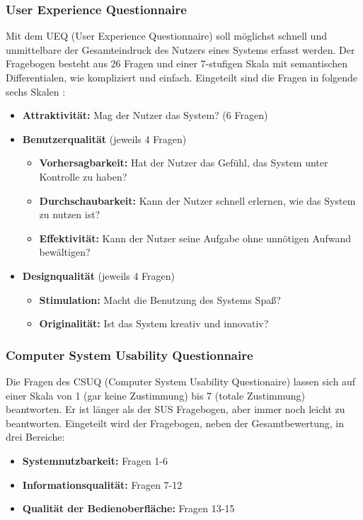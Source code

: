 \subsubsection*{User Experience Questionnaire}
Mit dem UEQ (User Experience Questionnaire) soll möglichst schnell und unmittelbare der Gesamteindruck des Nutzers eines Systems erfasst werden. Der Fragebogen besteht aus 26 Fragen und einer 7-stufigen Skala mit semantischen Differentialen, wie kompliziert und einfach. Eingeteilt sind die Fragen in folgende sechs Skalen \cite{} :
\begin{itemize}
\item \textbf{Attraktivität:} Mag der Nutzer das System? (6 Fragen)
\item \textbf{Benutzerqualität} (jeweils 4 Fragen)
	\begin{itemize}
	\item \textbf{Vorhersagbarkeit:} Hat der Nutzer das Gefühl, das System unter Kontrolle zu haben?
	\item \textbf{Durchschaubarkeit:} Kann der Nutzer schnell erlernen, wie das System zu nutzen ist?
	\item \textbf{Effektivität:} Kann der Nutzer seine Aufgabe ohne unnötigen Aufwand bewältigen?
	\end{itemize}
\item \textbf{Designqualität} (jeweils 4 Fragen)
	\begin{itemize}
	\item \textbf{Stimulation:} Macht die Benutzung des Systems Spaß?
	\item \textbf{Originalität:} Ist das System kreativ und innovativ?
	\end{itemize}
\end{itemize}

\subsubsection*{Computer System Usability Questionnaire}
Die Fragen des CSUQ (Computer System Usability Questionaire) lassen sich auf einer Skala von 1 (gar keine Zustimmung) bis 7 (totale Zustimmung) beantworten. Er ist länger als der SUS Fragebogen, aber immer noch leicht zu beantworten. Eingeteilt wird der Fragebogen, neben der Gesamtbewertung, in drei Bereiche: 
\begin{itemize}
\item \textbf{Systemnutzbarkeit:} Fragen 1-6
\item \textbf{Informationsqualität:} Fragen 7-12
\item \textbf{Qualität der Bedienoberfläche:} Fragen 13-15
\end{itemize}

